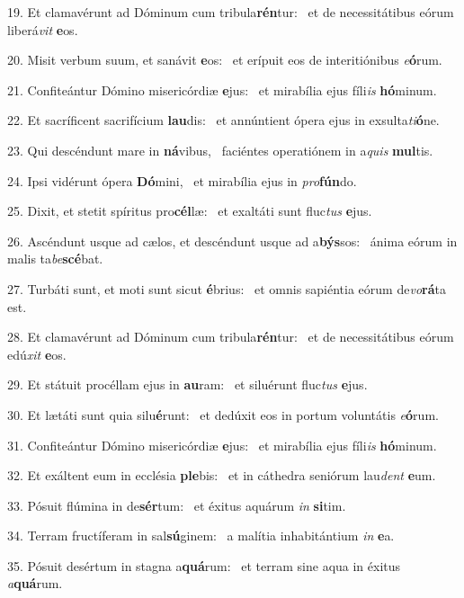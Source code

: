19. Et clamavérunt ad Dóminum cum tribula\textbf{rén}tur: \ast\  et de necessitátibus eórum liberá\textit{vit} \textbf{e}os.\

20. Misit verbum suum, et sanávit \textbf{e}os: \ast\  et erípuit eos de interitiónibus \textit{e}\textbf{ó}rum.\

21. Confiteántur Dómino misericórdiæ \textbf{e}jus: \ast\  et mirabília ejus fíli\textit{is} \textbf{hó}minum.\

22. Et sacríficent sacrifícium \textbf{lau}dis: \ast\  et annúntient ópera ejus in exsulta\textit{ti}\textbf{ó}ne.\

23. Qui descéndunt mare in \textbf{ná}vibus, \ast\  faciéntes operatiónem in a\textit{quis} \textbf{mul}tis.\

24. Ipsi vidérunt ópera \textbf{Dó}mini, \ast\  et mirabília ejus in \textit{pro}\textbf{fún}do.\

25. Dixit, et stetit spíritus pro\textbf{cél}læ: \ast\  et exaltáti sunt fluc\textit{tus} \textbf{e}jus.\

26. Ascéndunt usque ad cælos, et descéndunt usque ad a\textbf{býs}sos: \ast\  ánima eórum in malis ta\textit{be}\textbf{scé}bat.\

27. Turbáti sunt, et moti sunt sicut \textbf{é}brius: \ast\  et omnis sapiéntia eórum de\textit{vo}\textbf{rá}ta est.\

28. Et clamavérunt ad Dóminum cum tribula\textbf{rén}tur: \ast\  et de necessitátibus eórum edú\textit{xit} \textbf{e}os.\

29. Et státuit procéllam ejus in \textbf{au}ram: \ast\  et siluérunt fluc\textit{tus} \textbf{e}jus.\

30. Et lætáti sunt quia silu\textbf{é}runt: \ast\  et dedúxit eos in portum voluntátis \textit{e}\textbf{ó}rum.\

31. Confiteántur Dómino misericórdiæ \textbf{e}jus: \ast\  et mirabília ejus fíli\textit{is} \textbf{hó}minum.\

32. Et exáltent eum in ecclésia \textbf{ple}bis: \ast\  et in cáthedra seniórum lau\textit{dent} \textbf{e}um.\

33. Pósuit flúmina in de\textbf{sér}tum: \ast\  et éxitus aquárum \textit{in} \textbf{si}tim.\

34. Terram fructíferam in sal\textbf{sú}ginem: \ast\  a malítia inhabitántium \textit{in} \textbf{e}a.\

35. Pósuit desértum in stagna a\textbf{quá}rum: \ast\  et terram sine aqua in éxitus \textit{a}\textbf{quá}rum.\

